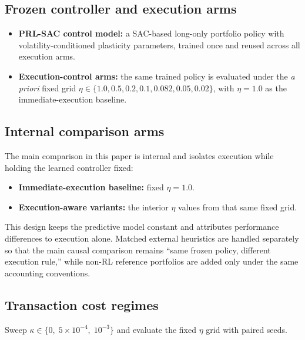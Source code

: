 \documentclass[10pt,twocolumn]{article}
\newcommand{\kappaTC}{\kappa}
\begin{document}
\subsection{Frozen controller and execution arms}
\begin{itemize}[leftmargin=*,itemsep=1pt]
\item \textbf{PRL-SAC control model:} a SAC-based long-only portfolio policy with volatility-conditioned plasticity parameters, trained once and reused across all execution arms.
\item \textbf{Execution-control arms:} the same trained policy is evaluated under the \emph{a priori} fixed grid $\eta\in\{1.0, 0.5, 0.2, 0.1, 0.082, 0.05, 0.02\}$, with $\eta=1.0$ as the immediate-execution baseline.
\end{itemize}

\subsection{Internal comparison arms}
The main comparison in this paper is internal and isolates execution while holding the learned controller fixed:
\begin{itemize}[leftmargin=*,itemsep=1pt]
\item \textbf{Immediate-execution baseline:} fixed $\eta=1.0$.
\item \textbf{Execution-aware variants:} the interior $\eta$ values from that same fixed grid.
\end{itemize}
This design keeps the predictive model constant and attributes performance differences to execution alone. Matched external heuristics are handled separately so that the main causal comparison remains ``same frozen policy, different execution rule,'' while non-RL reference portfolios are added only under the same accounting conventions.

\subsection{Transaction cost regimes}
Sweep $\kappaTC\in\{0,\;5\times10^{-4},\;10^{-3}\}$ and evaluate the fixed $\eta$ grid with paired seeds.
\end{document}
